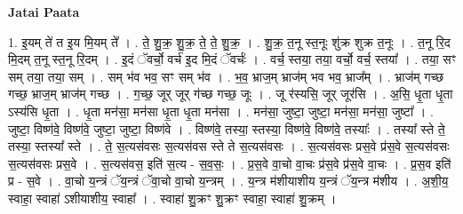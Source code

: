 \documentclass[17pt]{extarticle}
\begin{document}
\textbf{Jatai Paata} \newline

1. इ॒यम् ते॑ त इ॒य मि॒यम् ते᳚ । . ते॒ शु॒क्र॒ शु॒क्र॒ ते॒ ते॒ शु॒क्र॒ । . शु॒क्र॒ त॒नू स्त॒नूः शु॑क्र शुक्र त॒नूः । . त॒नू रि॒द मि॒दम् त॒नू स्त॒नू रि॒दम् । . इ॒दं ॅवर्चो॒ वर्च॑ इ॒द मि॒दं ॅवर्चः॑ । . वर्च॒ स्तया॒ तया॒ वर्चो॒ वर्च॒ स्तया᳚ । . तया॒ सꣳ सम् तया॒ तया॒ सम् । . सम् भ॑व भव॒ सꣳ सम् भ॑व । . भ॒व॒ भ्राज॒म् भ्राज॑म् भव भव॒ भ्राज᳚म् । . भ्राज॑म् गच्छ गच्छ॒ भ्राज॒म् भ्राज॑म् गच्छ । . ग॒च्छ॒ जूर् जूर् ग॑च्छ गच्छ॒ जूः । . जू र॑स्यसि॒ जूर् जूर॑सि । . अ॒सि॒ धृ॒ता धृ॒ता ऽस्य॑सि धृ॒ता । . धृ॒ता मन॑सा॒ मन॑सा धृ॒ता धृ॒ता मन॑सा । . मन॑सा॒ जुष्टा॒ जुष्टा॒ मन॑सा॒ मन॑सा॒ जुष्टा᳚ । . जुष्टा॒ विष्ण॑वे॒ विष्ण॑वे॒ जुष्टा॒ जुष्टा॒ विष्ण॑वे । . विष्ण॑वे॒ तस्या॒ स्तस्या॒ विष्ण॑वे॒ विष्ण॑वे॒ तस्याः᳚ । . तस्या᳚ स्ते ते॒ तस्या॒ स्तस्या᳚ स्ते । . ते॒ स॒त्यस॑वसः स॒त्यस॑वस स्ते ते स॒त्यस॑वसः । . स॒त्यस॑वसः प्रस॒वे प्र॑स॒वे स॒त्यस॑वसः स॒त्यस॑वसः प्रस॒वे । . स॒त्यस॑वस॒ इति॑ स॒त्य - स॒व॒सः॒ । . प्र॒स॒वे वा॒चो वा॒चः प्र॑स॒वे प्र॑स॒वे वा॒चः । . प्र॒स॒व इति॑ प्र - स॒वे । . वा॒चो य॒न्त्रं ॅय॒न्त्रं ॅवा॒चो वा॒चो य॒न्त्रम् । . य॒न्त्र म॑शीयाशीय य॒न्त्रं ॅय॒न्त्र म॑शीय । . अ॒शी॒य॒ स्वाहा॒ स्वाहा॑ ऽशीयाशीय॒ स्वाहा᳚ । . स्वाहा॑ शु॒क्रꣳ शु॒क्रꣳ स्वाहा॒ स्वाहा॑ शु॒क्रम् । \newline
\end{document}
